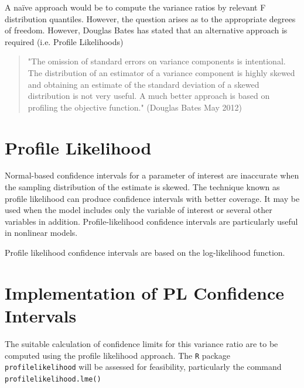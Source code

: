 \documentclass[12pt, a4paper]{report}
\theoremstyle{plain}
\theoremstyle{definition}
\theoremstyle{remark}
\begin{document}
	A naïve approach would be to compute the variance ratios by relevant F distribution quantiles. However, the question arises as to the appropriate degrees of freedom. However, Douglas Bates has stated that an alternative approach is required (i.e. Profile Likelihoods)
	
	\begin{quote}
		"The omission of standard errors on variance components is intentional.
		The distribution of an estimator of a variance component is highly
		skewed and obtaining an estimate of the standard deviation of a skewed
		distribution is not very useful.  A much better approach is based on
		profiling the objective function." (Douglas Bates May 2012)
	\end{quote}
	
	
	\section{Profile Likelihood}
	Normal-based confidence intervals for a parameter of interest are inaccurate when the sampling distribution of the estimate is skewed. The technique known as profile likelihood can produce confidence intervals with better coverage. It may be used when the model includes only the variable of interest or several other variables in addition. Profile-likelihood confidence intervals are particularly useful in nonlinear models.
	
	Profile likelihood confidence intervals are based on the log-likelihood function.  
	
	
	\section{Implementation of PL Confidence Intervals}
	
	The suitable calculation of confidence limits for this variance ratio are to be computed using the profile likelihood approach. The \texttt{R} package \texttt{profilelikelihood} will be assessed for feasibility, particularly the command \texttt{profilelikelihood.lme()}
	
\end{document}
